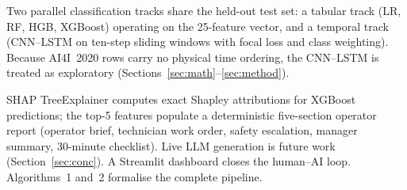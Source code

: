 \documentclass[sensors,article,submit,pdftex,moreauthors]{Definitions/mdpi}
\begin{document}
Two parallel classification tracks share the held-out test set: a
tabular track (LR, RF, HGB, XGBoost) operating on the 25-feature
vector, and a temporal track (CNN--LSTM on ten-step sliding windows
with focal loss and class weighting). Because AI4I~2020 rows carry
no physical time ordering, the CNN--LSTM is treated as exploratory
(Sections~\ref{sec:math}--\ref{sec:method}).

SHAP TreeExplainer \citep{ref-shap-lundberg} computes exact Shapley
attributions for XGBoost predictions; the top-5 features populate a
deterministic five-section operator report (operator brief,
technician work order, safety escalation, manager summary,
30-minute checklist). Live LLM generation is future work
(Section~\ref{sec:conc}). A Streamlit dashboard
\citep{ref-digital-twin-pdm2024} closes the human--AI loop.
Algorithms~1 and~2 formalise the complete pipeline.
\end{document}

